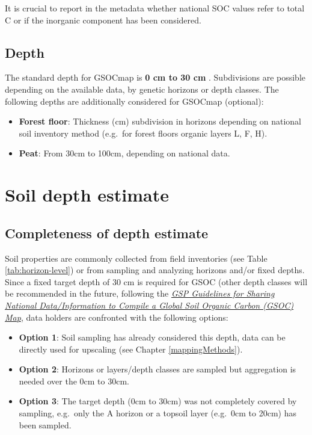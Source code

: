 \documentclass[10pt,b5paper,]{book}
\providecommand{\tightlist}{%
  \setlength{\itemsep}{0pt}\setlength{\parskip}{0pt}}
\theoremstyle{definition}
\theoremstyle{definition}
\theoremstyle{definition}
\theoremstyle{remark}
\begin{document}
It is crucial to report in the metadata whether national SOC values
refer to total C or if the inorganic component has been considered.

\hypertarget{depth}{%
\subsection{Depth}\label{depth}}

The standard depth for GSOCmap is \textbf{0 cm to 30 cm}
\citep{gsp_guidelines_2017}. Subdivisions are possible depending on the
available data, by genetic horizons or depth classes. The following
depths are additionally considered for GSOCmap (optional):

\begin{itemize}
\item
  \textbf{Forest floor}: Thickness (cm) subdivision in horizons
  depending on national soil inventory method (e.g.~for forest floors
  organic layers L, F, H).
\item
  \textbf{Peat}: From 30cm to 100cm, depending on national data.
\end{itemize}

\hypertarget{soil-depth-estimate}{%
\section{Soil depth estimate}\label{soil-depth-estimate}}

\hypertarget{completeness-of-depth-estimate}{%
\subsection{Completeness of depth
estimate}\label{completeness-of-depth-estimate}}

Soil properties are commonly collected from field inventories (see Table
\ref{tab:horizon-level}) or from sampling and analyzing horizons and/or
fixed depths. Since a fixed target depth of 30 cm is required for GSOC
(other depth classes will be recommended in the future, following the
\href{http://www.fao.org/3/a-bp164e.pdf}{\emph{GSP Guidelines for
Sharing National Data/Information to Compile a Global Soil Organic
Carbon (GSOC) Map}}, data holders are confronted with the following
options:

\begin{itemize}
\tightlist
\item
  \textbf{Option 1}: Soil sampling has already considered this depth,
  data can be directly used for upscaling (see Chapter
  \ref{mappingMethods}).
\item
  \textbf{Option 2}: Horizons or layers/depth classes are sampled but
  aggregation is needed over the 0cm to 30cm.
\item
  \textbf{Option 3}: The target depth (0cm to 30cm) was not completely
  covered by sampling, e.g.~only the A horizon or a topsoil layer
  (e.g.~0cm to 20cm) has been sampled.
\end{itemize}
\end{document}
